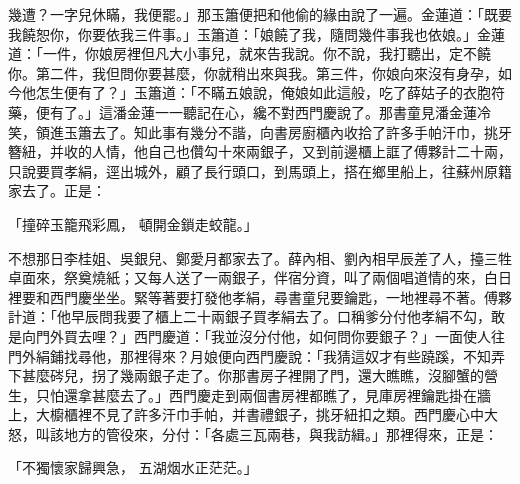 \begin{showcontents}{}
幾遭？一字兒休瞞，我便罷。」那玉簫便把和他偷的緣由說了一遍。金蓮道：「既要我饒恕你，你要依我三件事。」玉簫道：「娘饒了我，隨問幾件事我也依娘。」金蓮道：「一件，你娘房裡但凡大小事兒，就來告我說。你不說，我打聽出，定不饒你。第二件，我但問你要甚麼，你就稍出來與我。第三件，你娘向來沒有身孕，如今他怎生便有了？」玉簫道：「不瞞五娘說，俺娘如此這般，吃了薛姑子的衣胞符藥，便有了。」這潘金蓮一一聽記在心，纔不對西門慶說了。那書童見潘金蓮冷笑，領進玉簫去了。知此事有幾分不諧，向書房廚櫃內收拾了許多手帕汗巾，挑牙簪紐，并收的人情，他自己也儹勾十來兩銀子，又到前邊櫃上誆了傅夥計二十兩，只說要買孝絹，逕出城外，顧了長行頭口，到馬頭上，搭在鄉里船上，往蘇州原籍家去了。正是：

「撞碎玉籠飛彩鳳，  頓開金鎖走蛟龍。」

不想那日李桂姐、吳銀兒、鄭愛月都家去了。薛內相、劉內相早辰差了人，擡三牲卓面來，祭奠燒紙；又每人送了一兩銀子，伴宿分資，叫了兩個唱道情的來，白日裡要和西門慶坐坐。緊等著要打發他孝絹，尋書童兒要鑰匙，一地裡尋不著。傅夥計道：「他早辰問我要了櫃上二十兩銀子買孝絹去了。口稱爹分付他孝絹不勾，敢是向門外買去哩？」西門慶道：「我並沒分付他，如何問你要銀子？」一面使人往門外絹鋪找尋他，那裡得來？月娘便向西門慶說：「我猜這奴才有些蹺蹊，不知弄下甚麼硶兒，拐了幾兩銀子走了。你那書房子裡開了門，還大瞧瞧，沒腳蟹的營生，只怕還拿甚麼去了。」西門慶走到兩個書房裡都瞧了，見庫房裡鑰匙掛在牆上，大櫥櫃裡不見了許多汗巾手帕，并書禮銀子，挑牙紐扣之類。西門慶心中大怒，叫該地方的管役來，分付：「各處三瓦兩巷，與我訪緝。」那裡得來，正是：

「不獨懷家歸興急，  五湖烟水正茫茫。」


\end{showcontents}
